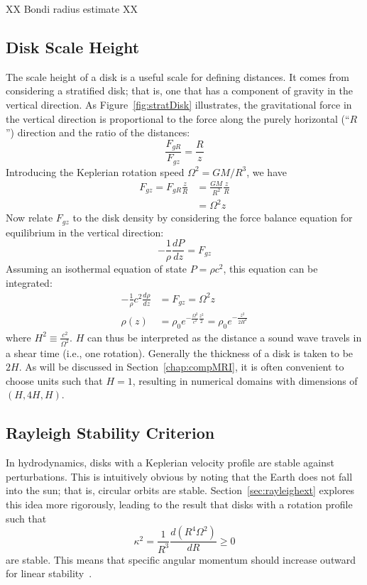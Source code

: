 XX Bondi radius estimate XX

\subsection{Disk Scale Height}\label{ssec:scaleheight}
The scale height of a disk is a useful scale for defining distances. It comes from considering a stratified disk; that is, one that has a component of gravity in the vertical direction. As Figure~\ref{fig:stratDisk} illustrates, the gravitational force in the vertical direction is proportional to the force along the purely horizontal (``$R$'') direction and the ratio of the distances:
\begin{equation}
\frac{F_{gR}}{F_{gz}}=\frac{R}{z}
\end{equation}
Introducing the Keplerian rotation speed $\Omega^2=GM/R^3$, we have  
\begin{align*}
F_{gz}=F_{gR}\frac z R&=\frac{GM}{R^2}\frac zR\\
&=\Omega^2 z
\end{align*}
Now relate $F_{gz}$ to the disk density by considering the force balance equation for equilibrium in the vertical direction:
\begin{equation*}
-\frac1\rho\frac{dP}{dz}=F_{gz}
\end{equation*}
Assuming an isothermal equation of state $P=\rho c^2$, this equation can be integrated:
\begin{align*}
-\frac1\rho c^2\frac{d\rho}{dz}&=F_{gz}=\Omega^2z\\
\rho(z)&=\rho_0 e^{-\frac{\Omega^2}{c^2}\frac{z^2}2}=\rho_0e^{-\frac{z^2}{2H^2}}
\end{align*}
where $H^2\equiv\frac{c^2}{\Omega^2}$. $H$ can thus be interpreted as the distance a sound wave travels in a shear time (i.e., one rotation). Generally the thickness of a disk is taken to be $2H$. As will be discussed in Section~\ref{chap:compMRI}, it is often convenient to choose units such that $H=1$, resulting in numerical domains with dimensions of $(H,4H,H)$. 

\subsection{Rayleigh Stability Criterion} \label{ssec:rayleighStability}
In hydrodynamics, disks with a Keplerian velocity profile are stable against perturbations. This is intuitively obvious by noting that the Earth does not fall into the sun; that is, circular orbits are stable. Section~\ref{sec:rayleighext} explores this idea more rigorously, leading to the result that disks with a rotation profile such that
\begin{equation}
  \kappa^2=\frac{1}{R^3}\frac{d(R^4\Omega^2)}{dR}\ge0
\end{equation}
are stable. This means that specific angular momentum should increase outward for linear stability~\cite{BH1998}. 

